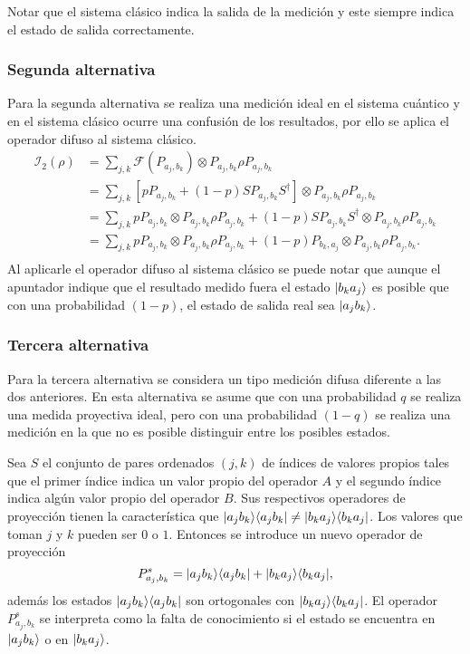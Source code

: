 Notar que el sistema clásico indica la salida de la medición y este siempre indica el estado de salida correctamente.

\subsubsection{Segunda alternativa}
Para la segunda alternativa se realiza una medición ideal en el sistema cuántico y en el sistema clásico ocurre una confusión de los resultados, por ello se aplica el operador difuso al sistema clásico. \begin{equation}
    \begin{split}
        \mathcal{I}_2(\rho)&=\sum_{j,k}\mathcal{F}(P_{a_j,b_k})\otimes P_{a_j,b_k} \rho P_{a_j,b_k}\\
        &=\sum_{j,k}[pP_{a_j,b_k}+(1-p)SP_{a_j,b_k}S^\dagger]\otimes P_{a_j,b_k} \rho P_{a_j,b_k}\\
        &=\sum_{j,k} pP_{a_j,b_k} \otimes P_{a_j,b_k} \rho P_{a_j,b_k}+(1-p)SP_{a_j,b_k}S^\dagger\otimes P_{a_j,b_k} \rho P_{a_j,b_k}\\
        &=\sum_{j,k} pP_{a_j,b_k} \otimes P_{a_j,b_k} \rho P_{a_j,b_k}+(1-p)P_{b_k,a_j}\otimes P_{a_j,b_k} \rho P_{a_j,b_k}.\\
    \end{split}
\end{equation} 
Al aplicarle el operador difuso al sistema clásico se puede notar que aunque el apuntador indique que el resultado medido fuera el estado $|b_k a_j\rangle$ es posible que con una probabilidad $(1-p)$, el estado de salida real sea $|a_j b_k\rangle$.



\subsubsection{Tercera alternativa}
Para la tercera alternativa se considera un tipo medición difusa diferente a las dos anteriores. En esta alternativa se asume que con una probabilidad $q$ se realiza una medida proyectiva ideal, pero con una probabilidad $(1-q)$ se realiza una medición en la que no es posible distinguir entre los posibles estados.


Sea $S$ el conjunto de pares ordenados $(j,k)$ de índices de  valores propios tales que el primer índice indica un valor propio del operador $A$ y el segundo índice indica algún valor propio del operador $B$. Sus respectivos operadores de proyección tienen la característica que  $|a_j b_k \rangle \langle a_j b_k|\ne|b_k a_j \rangle \langle b_k a_j |$. Los valores que toman $j$ y $k$ pueden ser $0$ o $1$. Entonces se introduce un nuevo operador de proyección \[P^{s}_{a_j,b_k}=|a_j b_k\rangle \langle a_j b_k|+|b_k a_j\rangle \langle b_k a_j|,\] además los estados $|a_j b_k\rangle \langle a_j b_k|$ son ortogonales con $|b_k a_j\rangle \langle b_k a_j|$. El operador $P^s_{a_j,b_k}$ se interpreta como la falta de conocimiento si el estado se encuentra en $|a_j b_k\rangle$ o en $|b_k a_j\rangle$. 


